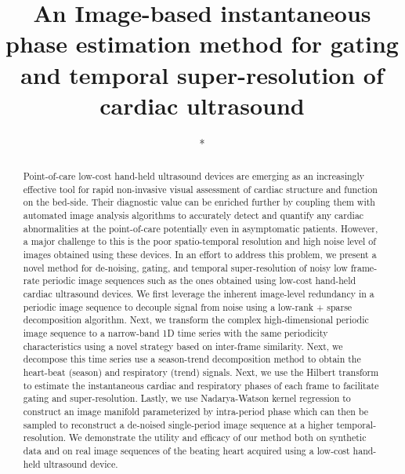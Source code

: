 \documentclass[runningheads,a4paper]{llncs}
\begin{document}
\mainmatter  %

\title{An Image-based instantaneous phase estimation method for gating and temporal super-resolution of cardiac ultrasound}


%
%

\author{*}
\authorrunning{*}   
\tocauthor{*}
\institute{*}

\maketitle

\begin{abstract}
Point-of-care low-cost hand-held ultrasound devices are emerging as an increasingly effective tool for rapid non-invasive visual assessment of cardiac structure and function on the bed-side. Their diagnostic value can be enriched further by coupling them with automated image analysis algorithms to accurately detect and quantify any cardiac abnormalities at the point-of-care potentially even in asymptomatic patients. However, a major challenge to this is the poor spatio-temporal resolution and high noise level of images obtained using these devices. In an effort to address this problem, we present a novel method for de-noising, gating, and temporal super-resolution of noisy low frame-rate periodic image sequences such as the ones obtained using low-cost hand-held cardiac ultrasound devices. We first leverage the inherent image-level redundancy in a periodic image sequence to decouple signal from noise using a low-rank + sparse decomposition algorithm. Next, we transform the complex high-dimensional periodic image sequence to a narrow-band 1D time series with the same periodicity characteristics using a novel strategy based on inter-frame similarity. Next, we decompose this time series use a season-trend decomposition method to obtain the heart-beat (season) and respiratory (trend) signals. Next, we use the Hilbert transform to estimate the instantaneous cardiac and respiratory phases of each frame to facilitate gating and super-resolution. Lastly, we use Nadarya-Watson kernel regression to construct an image manifold parameterized by intra-period phase which can then be sampled to reconstruct a de-noised single-period image sequence at a higher temporal-resolution. We demonstrate the utility and efficacy of our method both on synthetic data and on real image sequences of the beating heart acquired using a low-cost hand-held ultrasound device.
\end{abstract}
\end{document}
